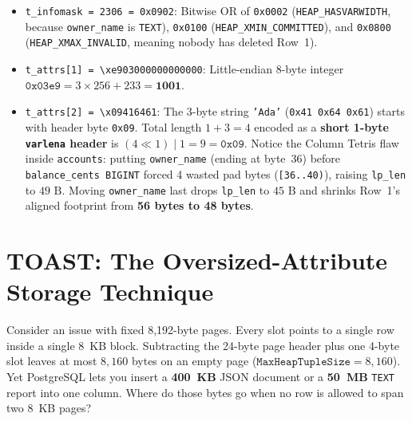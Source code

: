 \begin{labbox}
\begin{itemize}
  \item \texttt{t\_infomask = 2306 = 0x0902}: Bitwise OR of \texttt{0x0002} (\texttt{HEAP\_HASVARWIDTH}, because \texttt{owner\_name} is \texttt{TEXT}), \texttt{0x0100} (\texttt{HEAP\_XMIN\_COMMITTED}), and \texttt{0x0800} (\texttt{HEAP\_XMAX\_INVALID}, meaning nobody has deleted Row~1).
  \item \texttt{t\_attrs[1] = \textbackslash{}xe903000000000000}: Little-endian 8-byte integer $\texttt{0x03e9} = 3 \times 256 + 233 = \mathbf{1001}$.
  \item \texttt{t\_attrs[2] = \textbackslash{}x09416461}: The 3-byte string \texttt{'Ada'} (\texttt{0x41 0x64 0x61}) starts with header byte \texttt{0x09}. Total length $1 + 3 = 4$ encoded as a \textbf{short 1-byte \texttt{varlena} header} is $(4 \ll 1) \mid 1 = 9 = \texttt{0x09}$. Notice the Column Tetris flaw inside \texttt{accounts}: putting \texttt{owner\_name} (ending at byte~36) before \texttt{balance\_cents BIGINT} forced 4 wasted pad bytes (\texttt{[36..40)}), raising \texttt{lp\_len} to $49\text{ B}$. Moving \texttt{owner\_name} last drops \texttt{lp\_len} to $45\text{ B}$ and shrinks Row~1's aligned footprint from \textbf{56 bytes to 48 bytes}.
\end{itemize}
\end{labbox}

\section{TOAST: The Oversized-Attribute Storage Technique}
\label{sec:ch02-toast}

Consider an issue with fixed 8,192-byte pages. Every slot points to a single row inside a single 8~KB block. Subtracting the 24-byte page header plus one 4-byte slot leaves at most $8{,}160$ bytes on an empty page ($\texttt{MaxHeapTupleSize} = 8{,}160$). Yet PostgreSQL lets you insert a \textbf{400~KB} JSON document or a \textbf{50~MB} \texttt{TEXT} report into one column. Where do those bytes go when no row is allowed to span two 8~KB pages?

